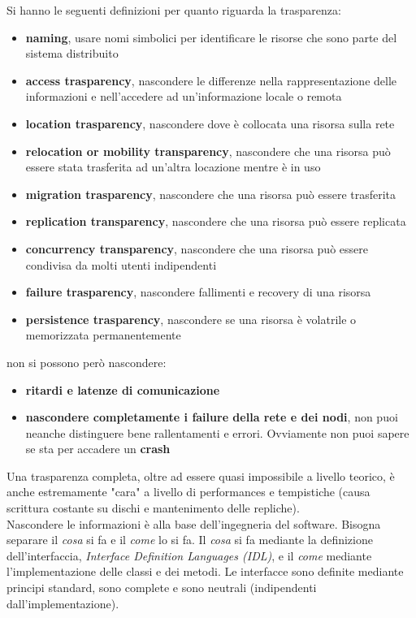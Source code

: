 \documentclass[a4paper,12pt, oneside]{book}
\begin{document}
Si hanno le seguenti definizioni per quanto riguarda la trasparenza:
\begin{itemize}
	\item \textbf{naming}, usare nomi simbolici per identificare le risorse che sono parte del sistema distribuito
	\item \textbf{access trasparency}, nascondere le differenze nella rappresentazione delle informazioni e nell'accedere ad un'informazione locale o remota
	\item \textbf{location trasparency}, nascondere dove è collocata una risorsa sulla rete
	\item  \textbf{relocation or mobility transparency}, nascondere che una risorsa può essere stata trasferita ad un'altra locazione mentre è in uso
	\item \textbf{migration trasparency}, nascondere che una risorsa può essere trasferita
	\item \textbf{replication transparency}, nascondere che una risorsa può essere replicata
	\item \textbf{concurrency transparency}, nascondere che una risorsa può essere condivisa da molti utenti indipendenti
	\item \textbf{failure trasparency}, nascondere fallimenti e recovery di una risorsa
	\item \textbf{persistence trasparency}, nascondere se una risorsa è volatrile o memorizzata permanentemente
\end{itemize}
non si possono però nascondere:
\begin{itemize}
	\item \textbf{ritardi e latenze di comunicazione}
	\item \textbf{nascondere completamente i failure della rete e dei nodi}, non puoi neanche distinguere bene rallentamenti e errori. Ovviamente non puoi sapere se sta per accadere un \textbf{crash}
\end{itemize}
Una trasparenza completa, oltre ad essere quasi impossibile a livello teorico, è anche estremamente "cara" a livello di performances e tempistiche (causa scrittura costante su dischi e mantenimento delle repliche).\\
Nascondere le informazioni è alla base dell'ingegneria del software. Bisogna separare il \textit{cosa} si fa e il \textit{come} lo si fa. Il \textit{cosa} si fa mediante la definizione dell'interfaccia, \textit{Interface Definition Languages (IDL)}, e il \textit{come} mediante l'implementazione delle classi e dei metodi. Le interfacce sono definite mediante principi standard, sono complete e sono neutrali (indipendenti dall'implementazione).
\end{document}
